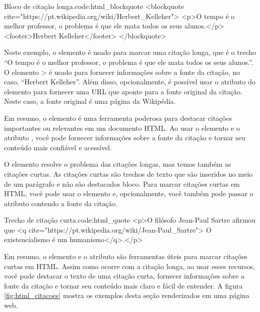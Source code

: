 \begin{htmlcode}{Bloco de citação longa.}{code:html_blockquote}
<blockquote cite="https://pt.wikipedia.org/wiki/Herbert_Kelleher">
  <p>O tempo é o melhor professor, o problema é que ele mata todos os seus alunos.</p>
  <footer>Herbert Kelleher</footer>
</blockquote>
\end{htmlcode}

Neste exemplo, o elemento  é usado para marcar uma citação longa, que é o trecho ``O tempo é o melhor professor, o problema é que ele mata todos os seus alunos.''. O elemento > é usado para fornecer informações sobre a fonte da citação, no caso, ``Herbert Kelleher''. Além disso, opcionalmente, é possível usar o atributo  do elemento  para fornecer uma URL que aponte para a fonte original da citação. Neste caso, a fonte original é uma página da Wikipédia.

Em resumo, o elemento  é uma ferramenta poderosa para destacar citações importantes ou relevantes em um documento HTML. Ao usar o elemento  e o atributo , você pode fornecer informações sobre a fonte da citação e tornar seu conteúdo mais confiável e acessível. 

O elemento  resolve o problema das citações longas, mas temos também as citações curtas. As citações curtas são trechos de texto que são inseridos no meio de um parágrafo e não são destacados bloco. Para marcar citações curtas em HTML, você pode usar o elemento  e, opcionalmente, você também pode passar o atributo  contendo a fonte da citação.

\begin{htmlcode}{Trecho de citação curta.}{code:html_quote}
<p>O filósofo Jean-Paul Sartre afirmou que 
    <q cite="https://pt.wikipedia.org/wiki/Jean-Paul_Sartre">
    O existencialismo é um humanismo</q>.</p>
\end{htmlcode}

Em resumo, o elemento  e o atributo  são ferramentas úteis para marcar citações curtas em HTML. Assim como ocorre com a citação longa, ao usar esses recursos, você pode destacar o texto de uma citação curta, fornecer informações sobre a fonte da citação e tornar seu conteúdo mais claro e fácil de entender. A figura \ref{fig:html_citacoes} mostra os exemplos desta seção renderizados em uma página web.

